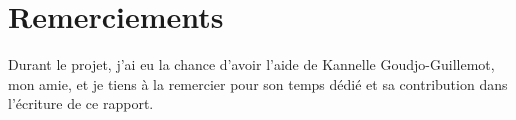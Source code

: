 \chapter*{Remerciements}

Durant le projet, j'ai eu la chance d'avoir l'aide de Kannelle Goudjo-Guillemot, mon amie, et je tiens à la remercier pour son temps dédié et sa contribution dans l'écriture de ce rapport.

